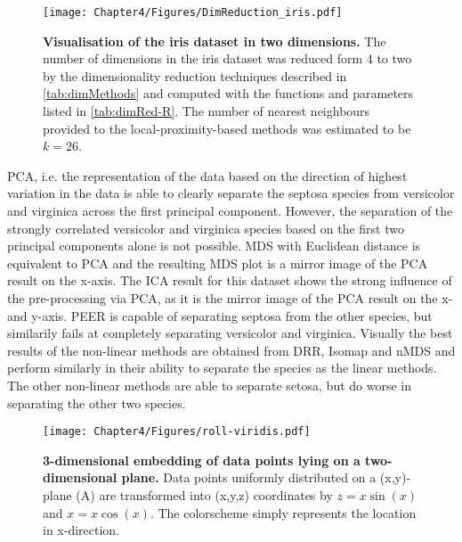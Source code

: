 \begin{figure}[h!]
	\centering
	\texttt{[image: Chapter4/Figures/DimReduction\_iris.pdf]}
	\caption[\textbf{Visualisation of the iris dataset in two dimensions.}]{\textbf{Visualisation of the iris dataset in two dimensions.} The number of dimensions in the iris dataset was reduced form \num{4} to two by the dimensionality reduction techniques described in \cref{tab:dimMethods} and computed with the functions and parameters listed in \cref{tab:dimRed-R}. The number of nearest neighbours provided to the local-proximity-based methods was estimated to be \(k=26\).} 
	 	\label{fig:dimRed-iris}
\end{figure}

 PCA, i.e. the representation of the data based on the direction of highest variation in the data is able to clearly separate the septosa species from versicolor and virginica across the first principal component. However, the separation of the strongly correlated versicolor and virginica species based on the first two principal components alone is not possible. MDS with Euclidean distance is equivalent to PCA and the resulting MDS plot is a mirror image of the PCA result on the x-axis. The ICA result for this dataset shows the strong influence of the pre-processing via PCA, as it is the mirror image of the PCA result on the x- and y-axis. PEER is capable of separating septosa from the other species, but similarily fails at completely separating versicolor and virginica. 
Visually the best results of the non-linear methods are obtained from DRR, Isomap and nMDS and perform similarly in their ability to separate the species as the linear methods. The other non-linear methods are able to separate setosa, but do worse in separating the other two species.


\begin{figure}[p]
	\centering
	\texttt{[image: Chapter4/Figures/roll-viridis.pdf]}\\
	\caption[\textbf{\num{3}-dimensional embedding of datapoints lying on a two-dimensional plane.} Generated via R function \textit{plot3D::scatter3D}]{\textbf{\num{3}-dimensional embedding of data points lying on a two-dimensional plane.} Data points uniformly distributed on a (x,y)-plane (A) are transformed into (x,y,z) coordinates by \(z = x \sin(x)\) and \(x = x \cos(x)\). The colorscheme simply represents the location in x-direction.}
 	\label{fig:roll}
\end{figure}

